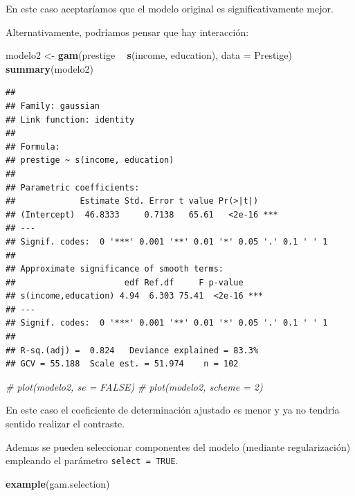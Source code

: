 \documentclass[
]{book}
\newenvironment{Shaded}{\begin{snugshade}}{\end{snugshade}}
\newcommand{\CommentTok}[1]{\textcolor[rgb]{0.56,0.35,0.01}{\textit{#1}}}
\newcommand{\DataTypeTok}[1]{\textcolor[rgb]{0.13,0.29,0.53}{#1}}
\newcommand{\KeywordTok}[1]{\textcolor[rgb]{0.13,0.29,0.53}{\textbf{#1}}}
\newcommand{\NormalTok}[1]{#1}
\newcommand{\OperatorTok}[1]{\textcolor[rgb]{0.81,0.36,0.00}{\textbf{#1}}}
\newcommand{\StringTok}[1]{\textcolor[rgb]{0.31,0.60,0.02}{#1}}
\theoremstyle{break}
\theoremstyle{definition}
\theoremstyle{definition}
\theoremstyle{definition}
\theoremstyle{remark}
\begin{document}
En este caso aceptaríamos que el modelo original es significativamente mejor.

Alternativamente, podríamos pensar que hay interacción:

\begin{Shaded}
\begin{Highlighting}[]
\NormalTok{modelo2 <-}\StringTok{ }\KeywordTok{gam}\NormalTok{(prestige }\OperatorTok{~}\StringTok{ }\KeywordTok{s}\NormalTok{(income, education), }\DataTypeTok{data =}\NormalTok{ Prestige)}
\KeywordTok{summary}\NormalTok{(modelo2)}
\end{Highlighting}
\end{Shaded}

\begin{verbatim}
## 
## Family: gaussian 
## Link function: identity 
## 
## Formula:
## prestige ~ s(income, education)
## 
## Parametric coefficients:
##             Estimate Std. Error t value Pr(>|t|)    
## (Intercept)  46.8333     0.7138   65.61   <2e-16 ***
## ---
## Signif. codes:  0 '***' 0.001 '**' 0.01 '*' 0.05 '.' 0.1 ' ' 1
## 
## Approximate significance of smooth terms:
##                      edf Ref.df     F p-value    
## s(income,education) 4.94  6.303 75.41  <2e-16 ***
## ---
## Signif. codes:  0 '***' 0.001 '**' 0.01 '*' 0.05 '.' 0.1 ' ' 1
## 
## R-sq.(adj) =  0.824   Deviance explained = 83.3%
## GCV = 55.188  Scale est. = 51.974    n = 102
\end{verbatim}

\begin{Shaded}
\begin{Highlighting}[]
\CommentTok{# plot(modelo2, se = FALSE)}
\CommentTok{# plot(modelo2, scheme = 2)}
\end{Highlighting}
\end{Shaded}

En este caso el coeficiente de determinación ajustado es menor y ya no tendría sentido realizar el contraste.

Ademas se pueden seleccionar componentes del modelo (mediante regularización) empleando el parámetro \texttt{select\ =\ TRUE}.

\begin{Shaded}
\begin{Highlighting}[]
\KeywordTok{example}\NormalTok{(gam.selection)}
\end{Highlighting}
\end{Shaded}
\end{document}
